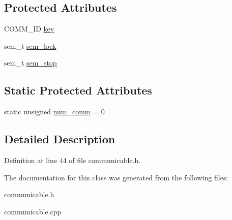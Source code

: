 \subsection*{Protected Attributes}
\begin{CompactItemize}
\item 
\hypertarget{classCommunicable_605b0efeffe81326f216c9903f5bbf4c}{
COMM\_\-ID \hyperlink{classCommunicable_605b0efeffe81326f216c9903f5bbf4c}{key}}
\label{classCommunicable_605b0efeffe81326f216c9903f5bbf4c}

\item 
\hypertarget{classCommunicable_cf9639312f71a2f348bc1e7789ccbd9d}{
sem\_\-t \hyperlink{classCommunicable_cf9639312f71a2f348bc1e7789ccbd9d}{sem\_\-lock}}
\label{classCommunicable_cf9639312f71a2f348bc1e7789ccbd9d}

\item 
\hypertarget{classCommunicable_29c53b9191348e0505e3bcba6d8b82b1}{
sem\_\-t \hyperlink{classCommunicable_29c53b9191348e0505e3bcba6d8b82b1}{sem\_\-stop}}
\label{classCommunicable_29c53b9191348e0505e3bcba6d8b82b1}

\end{CompactItemize}
\subsection*{Static Protected Attributes}
\begin{CompactItemize}
\item 
\hypertarget{classCommunicable_7a6acfdc781a67c9c0ec4f17893f86c3}{
static unsigned \hyperlink{classCommunicable_7a6acfdc781a67c9c0ec4f17893f86c3}{num\_\-comm} = 0}
\label{classCommunicable_7a6acfdc781a67c9c0ec4f17893f86c3}

\end{CompactItemize}


\subsection{Detailed Description}




Definition at line 44 of file communicable.h.

The documentation for this class was generated from the following files:\begin{CompactItemize}
\item 
communicable.h\item 
communicable.cpp\end{CompactItemize}
